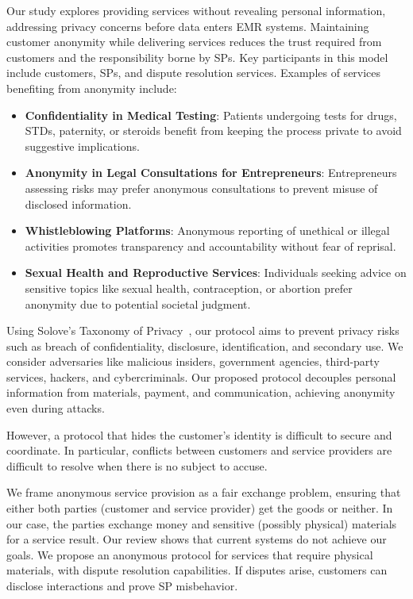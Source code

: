 \documentclass[pdftex,twocolumn,epjc3]{svjour3}
\begin{document}
\begin{sloppypar}
Our study explores providing services without revealing personal information, addressing privacy concerns before data enters EMR systems. Maintaining customer anonymity while delivering services reduces the trust required from customers and the responsibility borne by SPs. Key participants in this model include customers, SPs, and dispute resolution services. Examples of services benefiting from anonymity include:
\begin{itemize}
  \item \textbf{Confidentiality in Medical Testing}: Patients undergoing tests for drugs, STDs, paternity, or steroids benefit from keeping the process private to avoid suggestive implications.
  \item \textbf{Anonymity in Legal Consultations for Entrepreneurs}: Entrepreneurs assessing risks may prefer anonymous consultations to prevent misuse of disclosed information.
  \item \textbf{Whistleblowing Platforms}: Anonymous reporting of unethical or illegal activities promotes transparency and accountability without fear of reprisal.
  \item \textbf{Sexual Health and Reproductive Services}: Individuals seeking advice on sensitive topics like sexual health, contraception, or abortion prefer anonymity due to potential societal judgment.
\end{itemize}
\end{sloppypar}

\begin{sloppypar}
Using Solove's Taxonomy of Privacy~\cite{soloveTaxonomyPrivacy2006}, our protocol aims to prevent privacy risks such as breach of confidentiality, disclosure, identification, and secondary use. We consider adversaries like malicious insiders, government agencies, third-party services, hackers, and cybercriminals. Our proposed protocol decouples personal information from materials, payment, and communication, achieving anonymity even during attacks.
\end{sloppypar}

\begin{sloppypar}
However, a protocol that hides the customer's identity is difficult to secure and coordinate. In particular, conflicts between customers and service providers are difficult to resolve when there is no subject to accuse.
\end{sloppypar}

\begin{sloppypar}
We frame anonymous service provision as a fair exchange problem, ensuring that either both parties (customer and service provider) get the goods or neither. In our case, the parties exchange money and sensitive (possibly physical) materials for a service result. Our review shows that current systems do not achieve our goals. We propose an anonymous protocol for services that require physical materials, with dispute resolution capabilities. If disputes arise, customers can disclose interactions and prove SP misbehavior.
\end{sloppypar}
\end{document}
